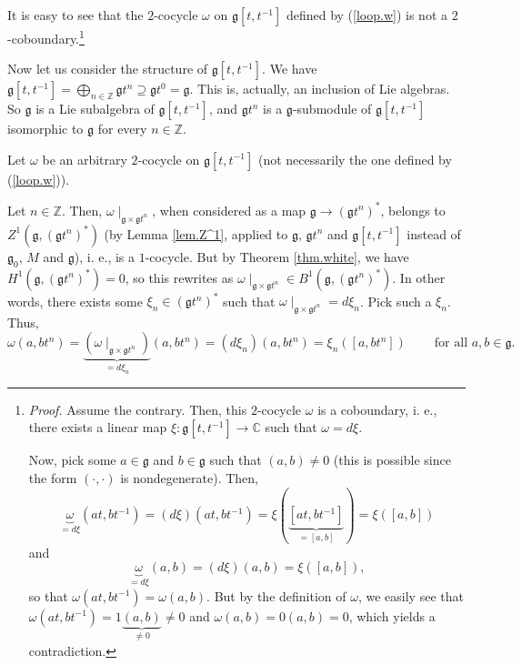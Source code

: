 \documentclass
[numbers=enddot,12pt,final,onecolumn,german,notitlepage]{scrartcl}%
\theoremstyle{definition}
\begin{document}
It is easy to see that the $2$-cocycle $\omega$ on $\mathfrak{g}\left[
t,t^{-1}\right]  $ defined by (\ref{loop.w}) is not a $2$%
-coboundary.\footnote{\textit{Proof.} Assume the contrary. Then, this
$2$-cocycle $\omega$ is a coboundary, i. e., there exists a linear map
$\xi:\mathfrak{g}\left[  t,t^{-1}\right]  \rightarrow\mathbb{C}$ such that
$\omega=d\xi$.
\par
Now, pick some $a\in\mathfrak{g}$ and $b\in\mathfrak{g}$ such that $\left(
a,b\right)  \neq0$ (this is possible since the form $\left(  \cdot
,\cdot\right)  $ is nondegenerate). Then,%
\[
\underbrace{\omega}_{=d\xi}\left(  at,bt^{-1}\right)  =\left(  d\xi\right)
\left(  at,bt^{-1}\right)  =\xi\left(  \underbrace{\left[  at,bt^{-1}\right]
}_{=\left[  a,b\right]  }\right)  =\xi\left(  \left[  a,b\right]  \right)
\]
and%
\[
\underbrace{\omega}_{=d\xi}\left(  a,b\right)  =\left(  d\xi\right)  \left(
a,b\right)  =\xi\left(  \left[  a,b\right]  \right)  ,
\]
so that $\omega\left(  at,bt^{-1}\right)  =\omega\left(  a,b\right)  $. But by
the definition of $\omega$, we easily see that $\omega\left(  at,bt^{-1}%
\right)  =1\underbrace{\left(  a,b\right)  }_{\neq0}\neq0$ and $\omega\left(
a,b\right)  =0\left(  a,b\right)  =0$, which yields a contradiction.}

Now let us consider the structure of $\mathfrak{g}\left[  t,t^{-1}\right]  $.
We have $\mathfrak{g}\left[  t,t^{-1}\right]  =\bigoplus\limits_{n\in
\mathbb{Z}}\mathfrak{g}t^{n}\supseteq\mathfrak{g}t^{0}=\mathfrak{g}$. This is,
actually, an inclusion of Lie algebras. So $\mathfrak{g}$ is a Lie subalgebra
of $\mathfrak{g}\left[  t,t^{-1}\right]  $, and $\mathfrak{g}t^{n}$ is a
$\mathfrak{g}$-submodule of $\mathfrak{g}\left[  t,t^{-1}\right]  $ isomorphic
to $\mathfrak{g}$ for every $n\in\mathbb{Z}$.

Let $\omega$ be an arbitrary $2$-cocycle on $\mathfrak{g}\left[
t,t^{-1}\right]  $ (not necessarily the one defined by (\ref{loop.w})).

Let $n\in\mathbb{Z}$. Then, $\omega\mid_{\mathfrak{g}\times\mathfrak{g}t^{n}}%
$, when considered as a map $\mathfrak{g}\rightarrow\left(  \mathfrak{g}%
t^{n}\right)  ^{\ast}$, belongs to $Z^{1}\left(  \mathfrak{g},\left(
\mathfrak{g}t^{n}\right)  ^{\ast}\right)  $ (by Lemma \ref{lem.Z^1}, applied
to $\mathfrak{g}$, $\mathfrak{g}t^{n}$ and $\mathfrak{g}\left[  t,t^{-1}%
\right]  $ instead of $\mathfrak{g}_{0}$, $M$ and $\mathfrak{g}$), i. e., is a
$1$-cocycle. But by Theorem \ref{thm.white}, we have $H^{1}\left(
\mathfrak{g},\left(  \mathfrak{g}t^{n}\right)  ^{\ast}\right)  =0$, so this
rewrites as $\omega\mid_{\mathfrak{g}\times\mathfrak{g}t^{n}}\in B^{1}\left(
\mathfrak{g},\left(  \mathfrak{g}t^{n}\right)  ^{\ast}\right)  $. In other
words, there exists some $\xi_{n}\in\left(  \mathfrak{g}t^{n}\right)  ^{\ast}$
such that $\omega\mid_{\mathfrak{g}\times\mathfrak{g}t^{n}}=d\xi_{n}$. Pick
such a $\xi_{n}$. Thus,%
\[
\omega\left(  a,bt^{n}\right)  =\underbrace{\left(  \omega\mid_{\mathfrak{g}%
\times\mathfrak{g}t^{n}}\right)  }_{=d\xi_{n}}\left(  a,bt^{n}\right)
=\left(  d\xi_{n}\right)  \left(  a,bt^{n}\right)  =\xi_{n}\left(  \left[
a,bt^{n}\right]  \right)  \ \ \ \ \ \ \ \ \ \ \text{for all }a,b\in
\mathfrak{g}.
\]
\end{document}
